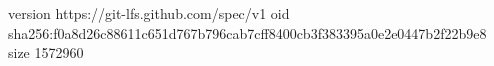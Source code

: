 version https://git-lfs.github.com/spec/v1
oid sha256:f0a8d26c88611c651d767b796cab7cff8400cb3f383395a0e2e0447b2f22b9e8
size 1572960
